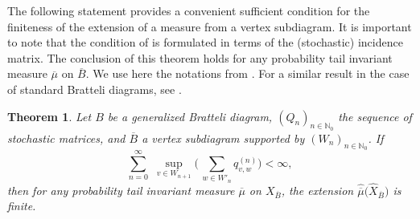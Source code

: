 \documentclass[11pt,reqno]{amsart}
\theoremstyle{definition}
\theoremstyle{remark}
\theoremstyle{plain}
\newtheorem{theorem}[definition]{Theorem}
\def\ol{\overline}
\def\wh{\widehat}
\newcommand{\N}{\mathbb N}
\numberwithin{equation}{section}
\begin{document}
The following statement provides a convenient sufficient condition 
for the finiteness of the extension of a measure from a vertex subdiagram. It is important to note that the condition
of  is formulated in terms 
of the (stochastic) incidence matrix. The conclusion of this theorem 
holds for any probability tail invariant measure $\ol\mu$ on $\ol B$.
We use here the notations from . For a similar result in the case of standard Bratteli diagrams, see
\cite[Theorem 2.2]{AdamskaBezuglyiKarpelKwiatkowski2017}.

\begin{theorem}\label{thm3 sufficient cond}
Let $B$ be a generalized Bratteli diagram, 
$(Q_n)_{n \in \N_0}$ the sequence of stochastic matrices, and $\overline B$ a vertex subdiagram supported by $(W_n)_{n \in \N_0}$. If \begin{equation}\label{eq3:suff cond finiteness}
    \sum_{n=0}^\infty\,\,\underset{v \in W_{n+1}}{\sup} 
    \Big(\,\underset{w \in W'_{n}}{\sum} q_{v,w}^{(n)} \Big) < \infty,
\end{equation} then for any probability tail invariant measure $\ol\mu$ on $X_{\overline B}$, the extension $\wh{\ol\mu} \big(\wh X_{\overline B}\big)$ is finite.
\end{theorem}
\end{document}
